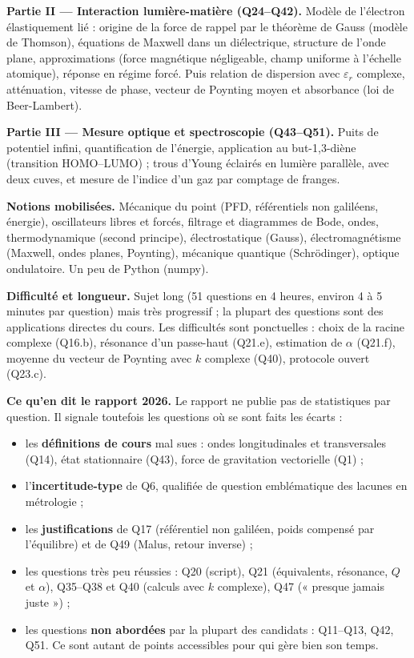 \documentclass[11pt,a4paper]{article}
\providecommand{\tightlist}{\setlength{\itemsep}{0pt}\setlength{\parskip}{0pt}}
\begin{document}
\textbf{Partie II --- Interaction lumière-matière (Q24--Q42).} Modèle de l'électron élastiquement lié : origine de la force de rappel par le théorème de Gauss (modèle de Thomson), équations de Maxwell dans un diélectrique, structure de l'onde plane, approximations (force magnétique négligeable, champ uniforme à l'échelle atomique), réponse en régime forcé. Puis relation de dispersion avec \(\varepsilon_r\) complexe, atténuation, vitesse de phase, vecteur de Poynting moyen et absorbance (loi de Beer-Lambert).

\textbf{Partie III --- Mesure optique et spectroscopie (Q43--Q51).} Puits de potentiel infini, quantification de l'énergie, application au but-1,3-diène (transition HOMO--LUMO) ; trous d'Young éclairés en lumière parallèle, avec deux cuves, et mesure de l'indice d'un gaz par comptage de franges.

\textbf{Notions mobilisées.} Mécanique du point (PFD, référentiels non galiléens, énergie), oscillateurs libres et forcés, filtrage et diagrammes de Bode, ondes, thermodynamique (second principe), électrostatique (Gauss), électromagnétisme (Maxwell, ondes planes, Poynting), mécanique quantique (Schrödinger), optique ondulatoire. Un peu de Python (numpy).

\textbf{Difficulté et longueur.} Sujet long (51 questions en 4 heures, environ 4 à 5 minutes par question) mais très progressif ; la plupart des questions sont des applications directes du cours. Les difficultés sont ponctuelles : choix de la racine complexe (Q16.b), résonance d'un passe-haut (Q21.e), estimation de \(\alpha\) (Q21.f), moyenne du vecteur de Poynting avec \(k\) complexe (Q40), protocole ouvert (Q23.c).

\textbf{Ce qu'en dit le rapport 2026.} Le rapport ne publie pas de statistiques par question. Il signale toutefois les questions où se sont faits les écarts :

\begin{itemize}
\tightlist
\item
  les \textbf{définitions de cours} mal sues : ondes longitudinales et transversales (Q14), état stationnaire (Q43), force de gravitation vectorielle (Q1) ;
\item
  l'\textbf{incertitude-type} de Q6, qualifiée de question emblématique des lacunes en métrologie ;
\item
  les \textbf{justifications} de Q17 (référentiel non galiléen, poids compensé par l'équilibre) et de Q49 (Malus, retour inverse) ;
\item
  les questions très peu réussies : Q20 (script), Q21 (équivalents, résonance, \(Q\) et \(\alpha\)), Q35--Q38 et Q40 (calculs avec \(k\) complexe), Q47 (« presque jamais juste ») ;
\item
  les questions \textbf{non abordées} par la plupart des candidats : Q11--Q13, Q42, Q51. Ce sont autant de points accessibles pour qui gère bien son temps.
\end{itemize}
\end{document}
